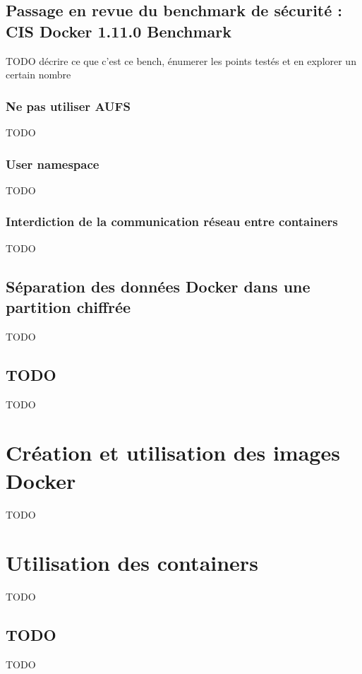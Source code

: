 \documentclass[11pt,a4paper,oneside]{report}
\begin{document}
\section{Passage en revue du benchmark de sécurité : CIS Docker 1.11.0 Benchmark}

TODO décrire ce que c'est ce bench, énumerer les points testés et en explorer un certain nombre

\subsection{Ne pas utiliser AUFS}

TODO

\subsection{User namespace}

TODO

\subsection{Interdiction de la communication réseau entre containers}

TODO

\section{Séparation des données Docker dans une partition chiffrée}

TODO

\section{TODO}

TODO

\chapter{Création et utilisation des images Docker}\label{creation_utilisation_images_docker}

TODO

\chapter{Utilisation des containers}\label{utilisation_containers}

TODO


\nocite{*} %



\begin{appendices}
  \chapter{TODO}

    TODO
\end{appendices}
\end{document}
